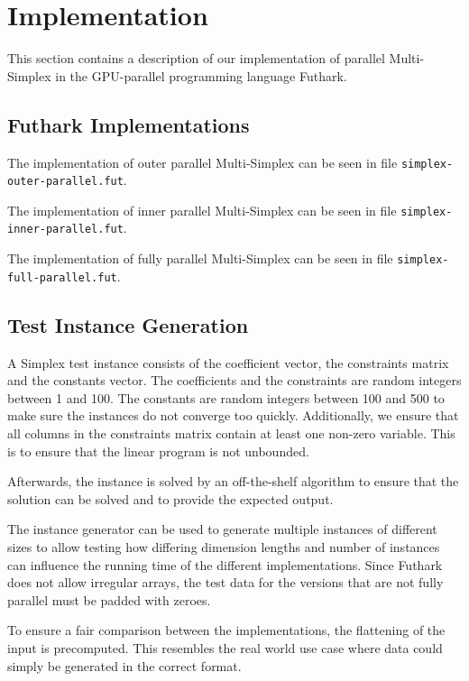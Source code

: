 \section{Implementation}

This section contains a description of our implementation of parallel Multi-Simplex in the GPU-parallel programming language Futhark.

\subsection{Futhark Implementations}
The implementation of outer parallel Multi-Simplex can be seen in file \texttt{simplex-outer-parallel.fut}.

\newpar
The implementation of inner parallel Multi-Simplex can be seen in file \texttt{simplex-inner-parallel.fut}.

\newpar
The implementation of fully parallel Multi-Simplex can be seen in file \texttt{simplex-full-parallel.fut}.

\subsection{Test Instance Generation}
A Simplex test instance consists of the coefficient vector, the constraints matrix and the constants vector. The coefficients and the constraints are random integers between 1 and 100. The constants are random integers between 100 and 500 to make sure the instances do not converge too quickly. Additionally, we ensure that all columns in the constraints matrix contain at least one non-zero variable. This is to ensure that the linear program is not unbounded.

Afterwards, the instance is solved by an off-the-shelf algorithm to ensure that the solution can be solved and to provide the expected output. 

The instance generator can be used to generate multiple instances of different sizes to allow testing how differing dimension lengths and number of instances can influence the running time of the different implementations. Since Futhark does not allow irregular arrays, the test data for the versions that are not fully parallel must be padded with zeroes. 

To ensure a fair comparison between the implementations, the flattening of the input is precomputed. This resembles the real world use case where data could simply be generated in the correct format.

